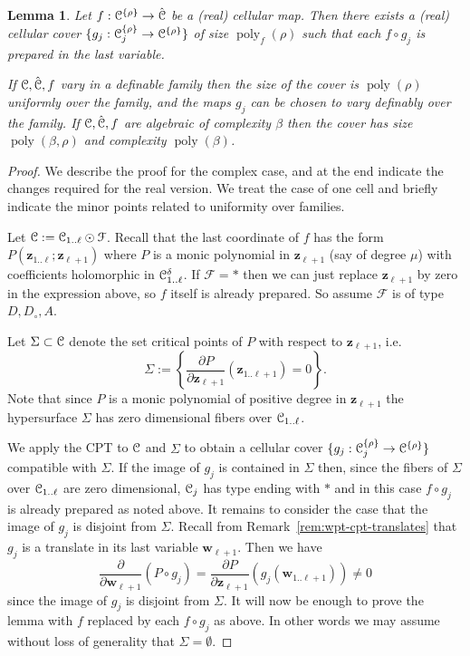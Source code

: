 \documentclass[reqno]{amsart}
\newtheorem{Lem}[Cor]{Lemma}{\bfseries}{\itshape}
\renewcommand\~[1]{\widetilde{#1}}
\def\pd#1#2{\frac{\partial#1}{\partial#2}}
\def\poly{\operatorname{poly}} \def\J{\operatorname{J}}
\def\cF{{\mathcal F}} \def\cL{{\mathcal L}} \def\cR{{\mathcal R}}
\def\vz{{\mathbf z}}
\def\vw{{\mathbf w}}
\def\he#1{{\{#1\}}}
\def\hrho{{\he\rho}}
\begin{document}
\begin{Lem}\label{lem:cprt-step}
  Let $f:\cC^\hrho\to\hat\cC$ be a (real) cellular map. Then there
  exists a (real) cellular cover $\{g_j:\cC_j^\hrho\to\cC^\hrho\}$ of
  size $\poly_f(\rho)$ such that each $f\circ g_j$ is prepared
  \emph{in the last variable}.

  If ${\mathcal C},\hat{{\mathcal C}},f$ vary in a definable family then the size of the
  cover is $\poly(\rho)$ uniformly over the family, and the maps $g_j$
  can be chosen to vary definably over the family. If ${\mathcal C},\hat{{\mathcal C}},f$
  are algebraic of complexity $\beta$ then the cover has size
  $\poly(\beta,\rho)$ and complexity $\poly(\beta)$.
\end{Lem}
\begin{proof}
  We describe the proof for the complex case, and at the end indicate
  the changes required for the real version. We treat the case of one
  cell and briefly indicate the minor points related to uniformity
  over families.

  Let $\cC:=\cC_{1..\ell}\odot\cF$. Recall that the last coordinate of
  $f$ has the form $P(\vz_{1..\ell};\vz_{\ell+1})$ where $P$ is a
  monic polynomial in $\vz_{\ell+1}$ (say of degree $\mu$) with
  coefficients holomorphic in ${\mathcal C}_{1..\ell}^\delta$. If $\cF=*$ then
  we can just replace $\vz_{\ell+1}$ by zero in the expression above,
  so $f$ itself is already prepared. So assume $\cF$ is of type
  $D,D_\circ,A$.

  Let $\Sigma\subset{\mathcal C}$ denote the set critical points of $P$ with respect to
  $\vz_{\ell+1}$, i.e.
  \begin{equation}
    \Sigma := \left\{ \pd{P}{\vz_{\ell+1}}(\vz_{1..\ell+1})=0 \right\}.
  \end{equation}
  Note that since $P$ is a monic polynomial of positive degree in
  $\vz_{\ell+1}$ the hypersurface $\Sigma$ has zero dimensional fibers
  over ${\mathcal C}_{1..\ell}$.
  
  We apply the CPT to ${\mathcal C}$ and $\Sigma$ to obtain a cellular cover
  $\{g_j:\cC_j^\hrho\to\cC^\hrho\}$ compatible with $\Sigma$. If the
  image of $g_j$ is contained in $\Sigma$ then, since the fibers of
  $\Sigma$ over ${\mathcal C}_{1..\ell}$ are zero dimensional, ${\mathcal C}_j$ has type
  ending with $*$ and in this case $f\circ g_j$ is already prepared as
  noted above. It remains to consider the case that the image of $g_j$
  is disjoint from $\Sigma$. Recall from
  Remark~\ref{rem:wpt-cpt-translates} that $g_j$ is a translate in its
  last variable $\vw_{\ell+1}$. Then we have
  \begin{equation}
    \pd{}{\vw_{\ell+1}}(P\circ g_j) = \pd{P}{\vz_{\ell+1}}(g_j(\vw_{1..\ell+1}))\neq0
  \end{equation}
  since the image of $g_j$ is disjoint from $\Sigma$. It will now be
  enough to prove the lemma with $f$ replaced by each $f\circ g_j$ as
  above. In other words we may assume without loss of generality that
  $\Sigma=\emptyset$.


\end{proof}
\end{document}
